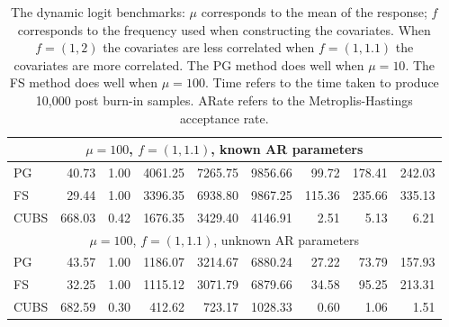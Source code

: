 \documentclass[11pt]{article}
\begin{document}
\begin{table}
\begin{tabular}{l r r r r r r r r }
\hline
 \multicolumn{9}{c}{$\mu=100$, $f = (1,1.1)$, known AR parameters} \\
\hline
             PG   &    40.73 &     1.00 &   4061.25 &   7265.75 &   9856.66 &     99.72 &    178.41 &    242.03 \\ 
             FS   &    29.44 &     1.00 &   3396.35 &   6938.80 &   9867.25 &    115.36 &    235.66 &    335.13 \\ 
           CUBS   &   668.03 &     0.42 &   1676.35 &   3429.40 &   4146.91 &      2.51 &      5.13 &      6.21
 \\ %

\hline
 \multicolumn{9}{c}{$\mu=100$, $f = (1,1.1)$, unknown AR parameters} \\
\hline
             PG   &    43.57 &     1.00 &   1186.07 &   3214.67 &   6880.24 &     27.22 &     73.79 &    157.93 \\ 
             FS   &    32.25 &     1.00 &   1115.12 &   3071.79 &   6879.66 &     34.58 &     95.25 &    213.31 \\ 
           CUBS   &   682.59 &     0.30 &    412.62 &    723.17 &   1028.33 &      0.60 &      1.06 &      1.51
 \end{tabular}
 \caption{\label{tab:dynnb-detail} The dynamic logit benchmarks: $\mu$
   corresponds to the mean of the response; $f$ corresponds to the frequency
   used when constructing the covariates.  When $f = (1,2)$ the covariates are
   less correlated when $f=(1,1.1)$ the covariates are more correlated.  The PG
   method does well when $\mu=10$.  The FS method does well when $\mu=100$. Time
   refers to the time taken to produce 10,000 post burn-in samples.  ARate
   refers to the Metroplis-Hastings acceptance rate.}
\end{table}


{}

\end{document}

